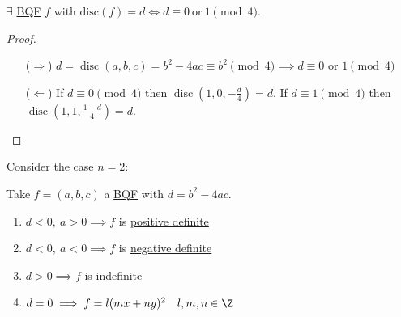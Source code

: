 \documentclass{article}
\DeclareMathOperator{\disc}{disc}
\begin{document}
\begin{nlemma}\label{lem:4.3}
    $\exists$ \hyperlink{def:bqf}{BQF} $f$ with $\mathrm{disc}(f) = d \iff d \equiv 0 \ \text{or}\ 1 \pmod{4}$.
\end{nlemma}
\begin{proof}\leavevmode
    \begin{itemize}
        \item[($\Rightarrow$)] $d = \disc(a, b, c) = b^2 - 4ac \equiv b^2 \pmod{4} \implies d \equiv 0 \text{ or } 1 \pmod{4}$
        \item [($\Leftarrow$)] If $d \equiv 0 \pmod{4}$ then $\disc(1,0,-\frac{d}{4}) = d$. If $d \equiv 1 \pmod{4}$ then $\disc(1,1,\frac{1-d}{4})=d$.
    \end{itemize}
\end{proof}



Consider the case $n = 2$:

\begin{nlemma}\label{lem:4.4}
    Take $f=(a,b,c)$ a \hyperlink{def:bqf}{BQF} with $d = b^2 - 4ac$.
    \begin{enumerate}[label=(\roman*)]
        \item $d<0,\ a>0 \implies f$ is \hyperlink{def:definite}{positive definite}
        \item $d<0,\ a<0 \implies f$ is \hyperlink{def:definite}{negative definite}
        \item $d>0 \implies f$ is \hyperlink{def:definite}{indefinite}
        \item $d=0 \implies f = l(m x + ny)^2 \quad l,m,n \in \Z$
    \end{enumerate}
\end{nlemma}
\end{document}
